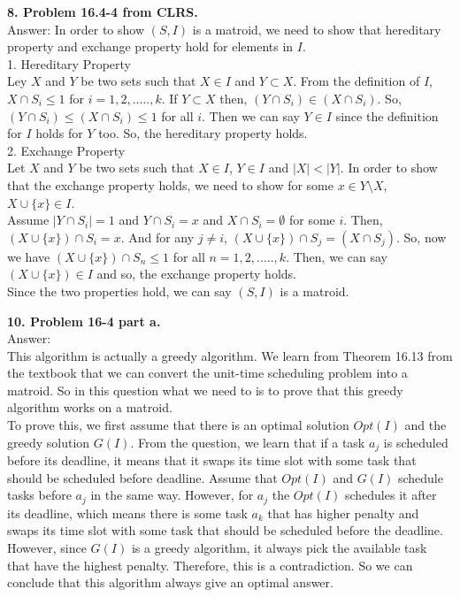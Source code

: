 \documentclass{article}
\begin{document}
\noindent
\textbf{8. Problem 16.4-4 from CLRS.} \\ \newline
Answer: In order to show $(S,I)$ is a matroid, we need to show that hereditary property and exchange property hold for elements in $I$. \\
1. Hereditary Property \\
Ley $X$ and $Y$ be two sets such that $X \in I$ and $Y \subset X$. From the definition of $I$, $X \cap S_i \leq 1$ for $i = 1, 2, ....., k$. If $Y \subset X$ then, $(Y \cap S_i) \in (X \cap S_i)$. So, $(Y \cap S_i) \leq (X \cap S_i) \leq 1$ for all $i$. Then we can say $Y \in I$ since the definition for $I$ holds for $Y$ too. So, the hereditary property holds. \\
2. Exchange Property \\
Let $X$ and $Y$ be two sets such that $X \in I$, $Y \in I$ and $|X| < |Y|$. In order to show that the exchange property holds, we need to show for some $x \in Y \setminus X$, $X \cup \{x\} \in I$.\\
 Assume $|Y \cap S_i| = 1$ and $Y \cap S_i = x$ and $X \cap S_i = \emptyset$ for some $i$. Then, $(X \cup \{x\}) \cap S_i = x$. And for any $j \neq i$, $(X \cup \{x\}) \cap S_j = (X \cap S_j)$. So, now we have $(X \cup \{x\}) \cap S_n \leq 1$ for all $n = 1, 2, ....., k$. Then, we can say  $(X \cup \{x\}) \in I$ and so, the exchange property holds.\\
Since the two properties hold, we can say $(S, I)$ is a matroid. \\ \newline

\noindent
\textbf{10. Problem 16-4 part a.} \\ \newline
\noindent
Answer: \\ \newline
\noindent
This algorithm is actually a greedy algorithm. We learn from Theorem 16.13 from the textbook that we can convert the unit-time scheduling problem into a matroid. So in this question what we need to is to prove that this greedy algorithm works on a matroid. \\ \newline
To prove this, we first assume that there is an optimal solution $Opt(I)$ and the greedy solution $G(I)$. From the question, we learn that if a task $a_j$ is scheduled before its deadline, it means that it swaps its time slot with some task that should be scheduled before deadline. Assume that $Opt(I)$ and $G(I)$ schedule tasks before $a_j$ in the same way. However, for $a_j$ the $Opt(I)$ schedules it after its deadline, which means there is some task $a_k$ that has higher penalty and swaps its time slot with some task that should be scheduled before the deadline. However, since $G(I)$ is a greedy algorithm, it always pick the available task that have the highest penalty. Therefore, this is a contradiction. So we can conclude that this algorithm always give an optimal answer.
\end{document}
